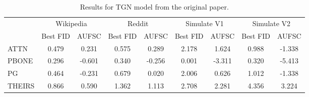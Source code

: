 \begin{table}
\centering
\begin{tabular}{lcccccccc}
\toprule
 & \multicolumn{2}{c}{Wikipedia} & \multicolumn{2}{c}{Reddit} & \multicolumn{2}{c}{Simulate V1} & \multicolumn{2}{c}{Simulate V2} \\
 & Best FID & AUFSC & Best FID & AUFSC & Best FID & AUFSC & Best FID & AUFSC \\
\midrule
ATTN & 0.479 & 0.231 & 0.575 & 0.289 & 2.178 & 1.624 & 0.988 & -1.338 \\
PBONE & 0.296 & -0.601 & 0.340 & -0.256 & 0.001 & -3.311 & 0.320 & -5.413 \\
PG & 0.464 & -0.231 & 0.679 & 0.020 & 2.006 & 0.626 & 1.012 & -1.338 \\
THEIRS & 0.866 & 0.590 & 1.362 & 1.113 & 2.708 & 2.281 & 4.356 & 3.224 \\
\bottomrule
\end{tabular}
\caption{\label{tab:tgn_results_og}Results for TGN model from the original paper.}
\end{table}
